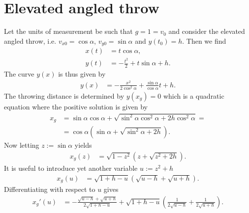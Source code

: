\documentclass[english, parskip=full]{scrartcl}
\title{\titel}
\author{\autor}
\date{\today}
\newcommand{\kla}{}
\begin{document}
\maketitle  %

\section{Elevated angled throw}
Let the units of measurement be such that $g=1=v_0$ and consider the elevated angled throw, i.e. $v_{x0} = \cos\alpha$, $v_{y0} = \sin\alpha$ and  $y(t_0) = h$.
Then we find
\begin{align}
x(t) &= t\cos\alpha,\\
y(t) &= -\frac{t^2}{2} + t\sin\alpha + h.
\end{align}
The curve $y(x)$ is thus given by
\begin{align}
y(x) &= -\frac{x^2}{2\cos^2\alpha} + \frac{\sin\alpha}{\cos\alpha} t + h.
\end{align}
The throwing distance is determined by $y(x_g) = 0$ which is a quadratic equation where the positive solution is given by
\begin{align}
x_g &= \sin\alpha\cos\alpha + \sqrt{\sin^2\alpha\cos^2\alpha + 2h\cos^2\alpha} = \\
&= \cos\alpha \kla\left( \sin\alpha + \sqrt{\sin^2\alpha + 2h} \right).
\end{align}
Now letting $z := \sin\alpha$ yields
\begin{align}
x_g(z) &= \sqrt{1 - z^2} \kla\left( z + \sqrt{z^2 + 2h} \right).
\end{align}
It is useful to introduce yet another variable $u := z^2 + h$ 
\begin{align}
x_g(u) &= \sqrt{1 + h - u} \kla\left( \sqrt{u - h} + \sqrt{u + h} \right).
\end{align}
Differentiating with respect to $u$ gives
\begin{align}
x_g'(u) &= -\frac{\sqrt{u - h} + \sqrt{u + h}}{2\sqrt{1 + h - u}} + \sqrt{1 + h - u} \kla\left( \frac{1}{2\sqrt{u - h}} + \frac{1}{2\sqrt{u + h}} \right).
\end{align}
\end{document}
